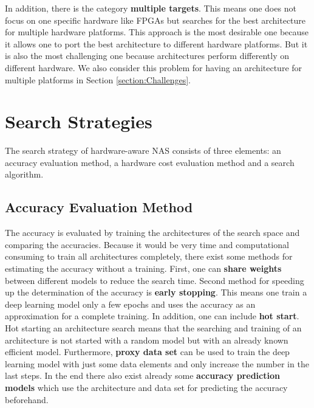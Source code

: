 \documentclass[conference]{IEEEtran}
\begin{document}
In addition, there is the category \textbf{multiple targets}. This means one does not focus on one specific hardware like FPGAs but searches for the best architecture for multiple hardware platforms. This approach is the most desirable one because it allows one to port the best architecture to different hardware platforms. But it is also the most challenging one because architectures perform differently on different hardware. We also consider this problem for having an architecture for multiple platforms in Section \ref{section:Challenges}. 

\section{Search Strategies}
\label{section:SearchStrategy}

The search strategy of hardware-aware NAS consists of three elements: an accuracy evaluation method, a hardware cost evaluation method and a search algorithm. 

\subsection{Accuracy Evaluation Method}
The accuracy is evaluated by training the architectures of the search space and comparing the accuracies. Because it would be very time and computational consuming to train all architectures completely, there exist some methods for estimating the accuracy without a training. First, one can \textbf{share weights} between different models to reduce the search time. Second method for speeding up the determination of the accuracy is \textbf{early stopping}. This means one train a deep learning model only a few epochs and uses the accuracy as an approximation for a complete training. In addition, one can include \textbf{hot start}. Hot starting an architecture search means that the searching and training of an architecture is not started with a random model but with an already known efficient model. Furthermore, \textbf{proxy data set} can be used to train the deep learning model with just some data elements and only increase the number in the last steps. In the end there also exist already some \textbf{accuracy prediction models} which use the architecture and data set for predicting the accuracy beforehand. 
\end{document}
